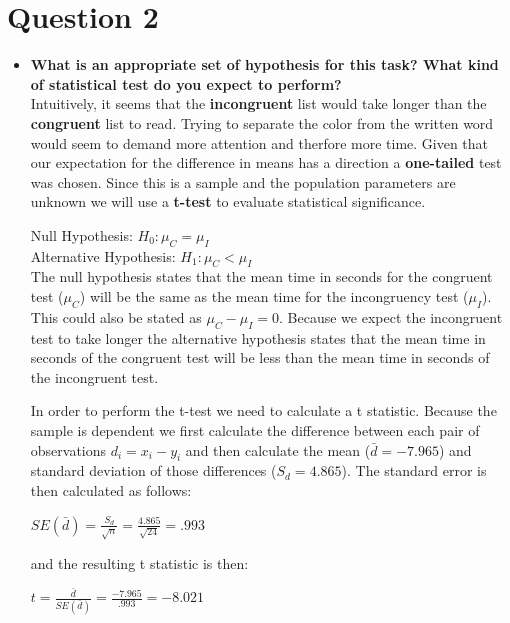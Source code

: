 \documentclass[a4paper,11pt]{report}
\begin{document}
\section{Question 2}
  \begin{itemize}  
    \item \textbf{What is an appropriate set of hypothesis for this task?  What kind of statistical test do you expect to perform?}\\
    Intuitively, it seems that the \textbf{incongruent} list would take longer than the \textbf{congruent} list to read.  Trying to separate the color from the written word would seem to demand more attention and therfore more time.  Given that our expectation for the difference in means has a direction a \textbf{one-tailed} test was chosen.  Since this is a sample and the population parameters are unknown we will use a \textbf{t-test} to evaluate statistical significance.  

    Null Hypothesis: \( H_0: \mu_C = \mu_I \)\\
    Alternative Hypothesis: \( H_1: \mu_C < \mu_I \)\\
    
    The null hypothesis states that the mean time in seconds for the congruent test (\(\mu_C \)) will be the same as the mean time for the incongruency test (\(\mu_I \)).  This could also be stated as \( \mu_C - \mu_I = 0 \).  Because we expect the incongruent test to take longer the alternative hypothesis states that the mean time in seconds of the congruent test will be less than the mean time in seconds of the incongruent test.
    
    In order to perform the t-test we need to calculate a t statistic.  Because the sample is dependent we first calculate the difference between each pair of observations \( d_i = x_i - y_i \) and then calculate the mean (\( \bar{d}=-7.965\)) and standard deviation of those differences (\( S_d=4.865 \)).  The standard error is then calculated as follows:
    \begin{center}
      \( SE(\bar{d}) = \frac{S_d}{\sqrt{n}}=\frac{4.865}{\sqrt{24}}=.993\)\\
    \end{center}
    and the resulting t statistic is then: \\
    \begin{center}
      \( t = \frac{\bar{d}}{SE(\bar{d})}=\frac{-7.965}{.993} = -8.021 \)
    \end{center}
  \end{itemize}
  
\end{document}
